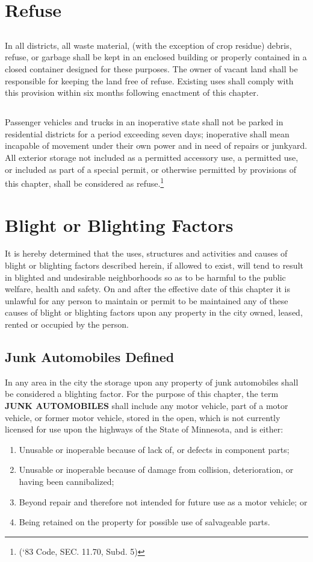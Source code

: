 \section{Refuse}
\subsection{}
In all districts, all waste material, (with the exception of crop residue) debris, refuse, or garbage shall be kept in an enclosed building or properly contained in a closed container designed for these purposes. The owner of vacant land shall be responsible for keeping the land free of refuse.  Existing uses shall comply with this provision within six months following enactment of this chapter.
\subsection{}
Passenger vehicles and trucks in an inoperative state shall not be parked in residential districts for a period exceeding seven days; inoperative shall mean incapable of movement under their own power and in need of repairs or junkyard. All exterior storage not included as a permitted accessory use, a permitted use, or included as part of a special permit, or otherwise permitted by provisions of this chapter, shall be considered as refuse.\footnote{(‘83 Code, SEC. 11.70, Subd. 5)}
\section{Blight or Blighting Factors}
It is hereby determined that the uses, structures and activities and causes of blight or blighting factors described herein, if allowed to exist, will tend to result in blighted and undesirable neighborhoods so as to be harmful to the public welfare, health and safety. On and after the effective date of this chapter it is unlawful for any person to maintain or permit to be maintained any of these causes of blight or blighting factors upon any property in the city owned, leased, rented or occupied by the person.
\subsection{Junk Automobiles Defined}
In any area in the city the storage upon any property of junk automobiles shall be considered a blighting factor. For the purpose of this chapter, the term \textbf{JUNK AUTOMOBILES} shall include any motor vehicle, part of a motor vehicle, or former motor vehicle, stored in the open, which is not currently licensed for use upon the highways of the State of Minnesota, and is either:
\begin{enumerate}[{\indent}1)]
    \item Unusable or inoperable because of lack of, or defects in component parts;
    \item Unusable or inoperable because of damage from collision, deterioration, or having been cannibalized;
    \item Beyond repair and therefore not intended for future use as a motor vehicle; or 
    \item Being retained on the property for possible use of salvageable parts.
\end{enumerate}
